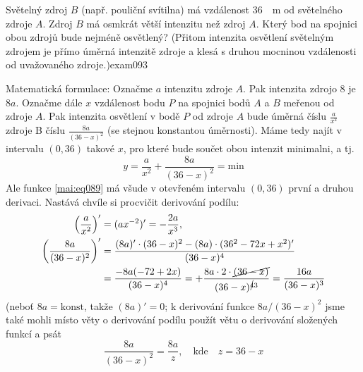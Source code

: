 \begin{mathexam}{Světelný zdroj \(B\) (např. pouliční svítilna) má vzdálenost
  \protect\SI{36}{\protect\m} od světelného zdroje \(A\). Zdroj \(B\) má osmkrát větší intenzitu než
  zdroj \(A\). Který bod na spojnici obou zdrojů bude nejméně osvětlený? (Přitom intenzita osvětlení
  světelným zdrojem je přímo úměrná intenzitě zdroje a klesá s druhou mocninou vzdálenosti od
  uvažovaného zdroje.)}{exam093} 
  
  {\centering
    \captionsetup{type=figure}
    \label{mai:fig063}
  \par}      

  Matematická formulace: Označme \(a\) intenzitu zdroje \(A\). Pak intenzita zdrojo \(8\) je \(8a\).
  Označme dále \(x\) vzdálenost bodu \(P\) na spojnici bodů \(A\) a \(B\) meřenou od zdroje \(A\).
  Pak intenzita osvětlení v bodě \(P\) od zdroje \(A\) bude úměrná číslu \(\frac{a}{x^2}\) zdroje B
  číslu \(\frac{8a}{(36 - x)^2}\) (se stejnou konstantou úměrnosti). Máme tedy najít v intervalu
  \((0,36)\) takové \(x\), pro které bude součet obou intenzit minimalni, a tj.
  \begin{equation}\label{mai:eq089}
    y = \dfrac{a}{x^2} + \dfrac{8a}{(36 - x)^2} = \text{min}
  \end{equation}
  Ale funkce \ref{mai:eq089} má všude v otevřeném intervalu  \((0,36)\) první a druhou derivaci.
  Nastává chvíle si procvičit derivování podílu:
  \begin{gather*}
    \begin{align*} 
      \left(\dfrac{a}{x^2}\right)'          
        &= (ax^{-2})' = -\dfrac{2a}{x^3},   \\ 
      \left( \dfrac{8a}{(36 - x)^2}\right)' 
        &= \dfrac{(8a)'\cdot(36 - x)^2 - (8a)\cdot(36^2 - 72x + x^2)'}{(36 - x)^4} \\
        &= \dfrac{-8a(-72 + 2x)}{(36 - x)^4} 
         = +\dfrac{8a\cdot2\cdot\cancel{(36 - x)}}{(36 - x)^{\cancel{4}3}}
         =  \dfrac{16a}{(36 - x)^3}
    \end{align*}
  \end{gather*}
  (neboť \(8a = \text{konst}\), takže \((8a)' = 0\); k derivování funkce \(8a/(36 - x)^2\) jsme také
  mohli místo věty o derivování podílu použít větu o derivování složených funkcí a psát
  \begin{equation*}
    \dfrac{8a}{(36 - x)^2} = \dfrac{8a}{z}, \quad\text{kde}\quad z = 36 - x

\end{equation*}
\end{mathexam}
